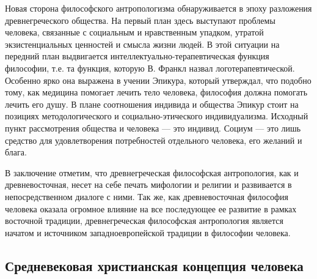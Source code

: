 \documentclass[12pt]{article}
\begin{document}
Новая сторона философского антропологизма обнаруживается в эпоху разложения древнегреческого общества.
На  первый  план  здесь  выступают  проблемы  человека,  связанные  с  социальным  и  нравственным  упадком,
утратой экзистенциальных ценностей и смысла жизни людей. В этой ситуации на передний план выдвигается
интеллектуально-терапевтическая  функция  философии,  т.е.  та  функция,  которую  В.  Франкл  назвал
логотерапевтической. Особенно ярко она выражена в учении Эпикура, который утверждал, что подобно тому,
как  медицина  помогает  лечить  тело  человека,  философия  должна  помогать  лечить  его  душу.  В  плане
соотношения  индивида  и  общества  Эпикур  стоит  на  позициях  методологического  и  социально-этического
индивидуализма. Исходный пункт рассмотрения общества и человека — это индивид. Социум — это лишь
средство для удовлетворения потребностей отдельного человека, его желаний и блага.

В заключение отметим, что древнегреческая философская антропология, как и древневосточная, несет на себе
печать мифологии и религии и развивается в непосредственном диалоге с ними.
Так же, как древневосточная философия человека оказала огромное влияние на все последующее ее развитие в
рамках  восточной  традиции,  древнегреческая  философская  антропология  является  начатом  и  источником
западноевропейской традиции в философии человека.

\subsection{Средневековая христианская концепция человека}
\end{document}
